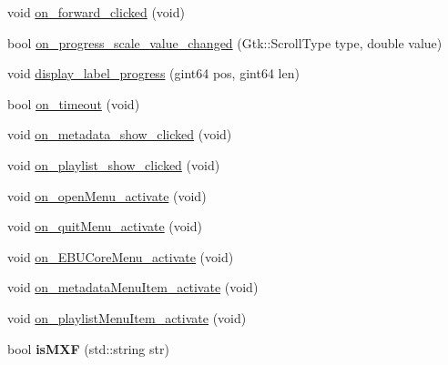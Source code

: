\begin{DoxyCompactItemize}
void \hyperlink{classplayerWindow_a3a9413175a51a9ca20243f6ed6794994}{on\-\_\-forward\-\_\-clicked} (void)
\item 
bool \hyperlink{classplayerWindow_a7e6f1b3f33e3d72260df6f4f30bb1baf}{on\-\_\-progress\-\_\-scale\-\_\-value\-\_\-changed} (Gtk\-::\-Scroll\-Type type, double value)
\item 
void \hyperlink{classplayerWindow_a0b4f67544949804ab52fe868bd8eef39}{display\-\_\-label\-\_\-progress} (gint64 pos, gint64 len)
\item 
bool \hyperlink{classplayerWindow_a68799b366fe4cd1633248cb3b515dcb1}{on\-\_\-timeout} (void)
\item 
void \hyperlink{classplayerWindow_a839f0516e5ce51452aed358d14a1783b}{on\-\_\-metadata\-\_\-show\-\_\-clicked} (void)
\item 
void \hyperlink{classplayerWindow_a49a11e5f7b341f954010655834d577ce}{on\-\_\-playlist\-\_\-show\-\_\-clicked} (void)
\item 
void \hyperlink{classplayerWindow_a5cb5d308894234c6011a8055466aff47}{on\-\_\-open\-Menu\-\_\-activate} (void)
\item 
void \hyperlink{classplayerWindow_a6c7be1634361e4a1b946a169a7144bf4}{on\-\_\-quit\-Menu\-\_\-activate} (void)
\item 
void \hyperlink{classplayerWindow_afb41e24747e3d2a33fbb77648eb470e8}{on\-\_\-\-E\-B\-U\-Core\-Menu\-\_\-activate} (void)
\item 
void \hyperlink{classplayerWindow_ab6cbc10e5945ad7fd972dfa6f65ee3f5}{on\-\_\-metadata\-Menu\-Item\-\_\-activate} (void)
\item 
void \hyperlink{classplayerWindow_a7c5c0b571cab520af2bc281828365368}{on\-\_\-playlist\-Menu\-Item\-\_\-activate} (void)
\item 
\hypertarget{classplayerWindow_acd016c68c49807989d6901fd837f1b40}{bool {\bfseries is\-M\-X\-F} (std\-::string str)}\label{classplayerWindow_acd016c68c49807989d6901fd837f1b40}

\end{DoxyCompactItemize}
